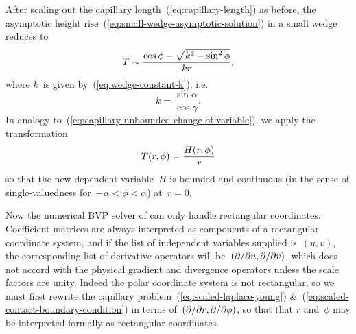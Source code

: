 After scaling out the capillary length~(\ref{eq:capillary-length})
as before,
the asymptotic height rise~(\ref{eq:small-wedge-asymptotic-solution})
in a small wedge reduces to
\begin{equation}
  T \sim \frac{\cos\phi - \sqrt{k^2 - \sin^2 \phi}}{k r},
  \label{eq:small-wedge-scaled-asymptotic-solution}
\end{equation}
where $k$~is given by~(\ref{eq:wedge-constant-k}), i.e.
\begin{equation}
  k = \frac{\sin\alpha}{\cos\gamma}.
  \label{eq:small-wedge-constant-k}
\end{equation}
In analogy to~(\ref{eq:capillary-unbounded-change-of-variable}),
we apply the transformation
\begin{equation}
  \savecontent{
    T (r, \phi) = \frac{H (r, \phi)}{r}
  }{eq:small-wedge-change-of-variable}
\end{equation}
so that the new dependent variable~$H$ is bounded and continuous
(in the sense of single-valuedness for~$-\alpha < \phi < \alpha$)
at~$r = 0$.

Now the numerical BVP solver of 
can only handle rectangular coordinates.
Coefficient matrices are always interpreted
as components of a rectangular coordinate system,
and if the list of independent variables supplied is~$(u, v)$,
the corresponding list of derivative operators
will be~$(\mathop{}\!\partial / {\mathop{}\!\partial u}, \mathop{}\!\partial / {\mathop{}\!\partial v})$,
which does not accord with
the physical gradient and divergence operators
unless the scale factors are unity.
Indeed the polar coordinate system is not rectangular,
so we must first rewrite the capillary problem~(\ref{eq:scaled-laplace-young})
\&~(\ref{eq:scaled-contact-boundary-condition})
in terms of~$(\mathop{}\!\partial / {\mathop{}\!\partial r}, \mathop{}\!\partial / {\mathop{}\!\partial\phi})$,
so that that $r$ and~$\phi$ may be interpreted formally
as rectangular coordinates.

